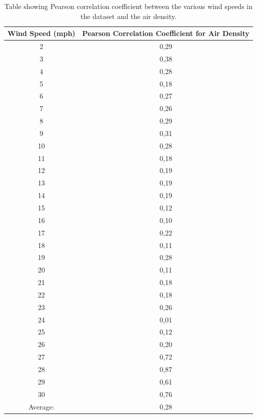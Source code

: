 \begin{table}[H]
\centering  %
\begin{tabular}{c c} %
Wind Speed (mph) & Pearson Correlation Coefficient for Air Density \\ [0.5ex] %
\hline                  %
2 & 0,29\\ \hline
3 & 0,38 \\ \hline
4 & 0,28 \\ \hline
5 & 0,18 \\ \hline
6 & 0,27 \\ \hline
7 & 0,26 \\ \hline
8 & 0,29 \\ \hline
9 & 0,31 \\ \hline
10 & 0,28  \\ \hline
11 & 0,18 \\ \hline
12 & 0,19 \\ \hline
13 & 0,19 \\ \hline
14 & 0,19 \\ \hline
15 & 0,12 \\ \hline
16 & 0,10 \\ \hline
17 & 0,22 \\ \hline
18 & 0,11 \\ \hline
19 & 0,28 \\ \hline
20 & 0,11 \\ \hline
21 & 0,18 \\ \hline
22 & 0,18 \\ \hline
23 & 0,26 \\ \hline
24 & 0,01 \\ \hline
25 & 0,12 \\ \hline
26 & 0,20 \\ \hline
27 & 0,72 \\ \hline
28 & 0,87 \\ \hline
29 & 0,61 \\ \hline
30 & 0,76 \\ \hline  
Average: & 0,28 \\ [1ex] %
\hline %
\end{tabular}
\caption{Table showing Pearson correlation coefficient between the various wind speeds in the dataset and the air density.} %
\label{table:pearsonCoeficientAirDensity} %
\end{table}

